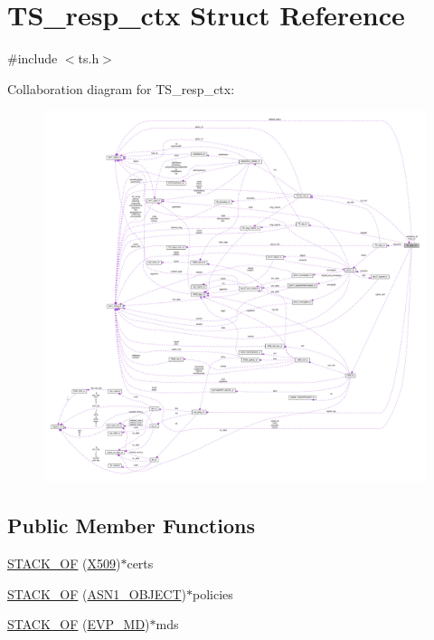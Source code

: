 \hypertarget{struct_t_s__resp__ctx}{}\section{T\+S\+\_\+resp\+\_\+ctx Struct Reference}
\label{struct_t_s__resp__ctx}


{\ttfamily \#include $<$ts.\+h$>$}



Collaboration diagram for T\+S\+\_\+resp\+\_\+ctx\+:
\nopagebreak
\begin{figure}[H]
\begin{center}
\leavevmode
\includegraphics[width=350pt]{struct_t_s__resp__ctx__coll__graph}
\end{center}
\end{figure}
\subsection*{Public Member Functions}
\begin{DoxyCompactItemize}
\item 
\hyperlink{struct_t_s__resp__ctx_aef18708d27bbe62bff39215781c83cc1}{S\+T\+A\+C\+K\+\_\+\+OF} (\hyperlink{ossl__typ_8h_a4f666bde6518f95deb3050c54b408416}{X509})$\ast$certs
\item 
\hyperlink{struct_t_s__resp__ctx_a9f12f42563eb755da572b2e1c41bbee9}{S\+T\+A\+C\+K\+\_\+\+OF} (\hyperlink{asn1_8h_ae10c08e4e6b23f67a39b2add932ec48f}{A\+S\+N1\+\_\+\+O\+B\+J\+E\+CT})$\ast$policies
\item 
\hyperlink{struct_t_s__resp__ctx_a4d642effed2757a87aa7d9aad82e6503}{S\+T\+A\+C\+K\+\_\+\+OF} (\hyperlink{ossl__typ_8h_aac66cf010326fa9a927c2a34888f45d3}{E\+V\+P\+\_\+\+MD})$\ast$mds
\end{DoxyCompactItemize}
